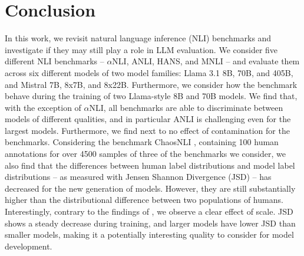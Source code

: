\section{Conclusion}

In this work, we revisit natural language inference (NLI) benchmarks and investigate if they may still play a role in LLM evaluation.
We consider five different NLI benchmarks -- $\alpha$NLI, ANLI, HANS, and MNLI -- and evaluate them across six different models of two model families: Llama 3.1 8B, 70B, and 405B, and Mistral 7B, 8x7B, and 8x22B.
Furthermore, we consider how the benchmark behave during the training of two Llama-style 8B and 70B models.
We find that, with the exception of $\alpha$NLI, all benchmarks are able to discriminate between models of different qualities, and in particular ANLI is challenging even for the largest models.
Furthermore, we find next to no effect of contamination for the benchmarks.
Considering the benchmark ChaosNLI \citep{nie-etal-2020-learn}, containing 100 human annotations for over 4500 samples of three of the benchmarks we consider, we also find that the differences between human label distributions and model label distributions -- as measured with Jensen Shannon Divergence (JSD) -- has decreased for the new generation of models.
However, they are still substantially higher than the distributional difference between two populations of humans. 
Interestingly, contrary to the findings of \citet{nie-etal-2020-learn}, we observe a clear effect of scale.
JSD shows a steady decrease during training, and larger models have lower JSD than smaller models, making it a potentially interesting quality to consider for model development.
